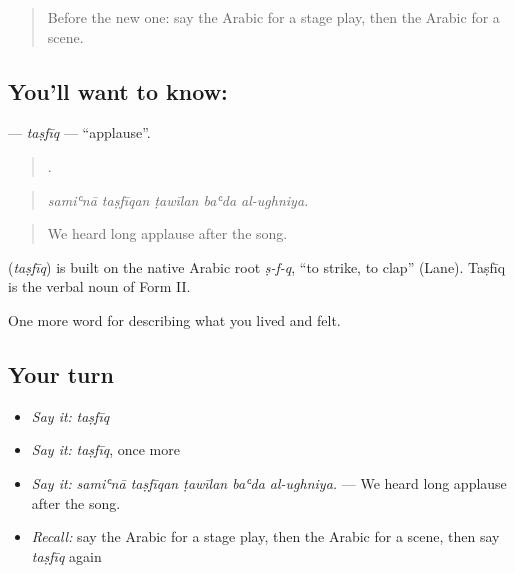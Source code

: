 \label{lesson:AR-C542-tasfiq}



\begin{quote}
Before the new one: say the Arabic for a stage play, then the Arabic for a scene.
\end{quote}

\subsection*{You'll want to know: }
\textbf{} — \emph{taṣfīq} — \textquotedblleft{}applause\textquotedblright{}.

\begin{quote}
    .
\end{quote}

\begin{quote}
\emph{samiʿnā taṣfīqan ṭawīlan baʿda al-ughniya.}
\end{quote}

\begin{quote}
We heard long applause after the song.
\end{quote}

\begin{cousinweb}
\textbf{} (\emph{taṣfīq}) is built on the native Arabic root \emph{ṣ-f-q}, \textquotedblleft{}to strike, to clap\textquotedblright{} (Lane). Taṣfīq is the verbal noun of Form II.
\end{cousinweb}

\begin{grammarlens}[title={What you've built}]
One more word for describing what you lived and felt.
\end{grammarlens}

\subsection*{Your turn}
\begin{itemize}
\raggedright
  \item \emph{Say it:} \emph{taṣfīq}
  \item \emph{Say it:} \emph{taṣfīq}, once more
  \item \emph{Say it:} \emph{samiʿnā taṣfīqan ṭawīlan baʿda al-ughniya.} — We heard long applause after the song.
  \item \emph{Recall:} say the Arabic for a stage play, then the Arabic for a scene, then say \emph{taṣfīq} again
\end{itemize}

